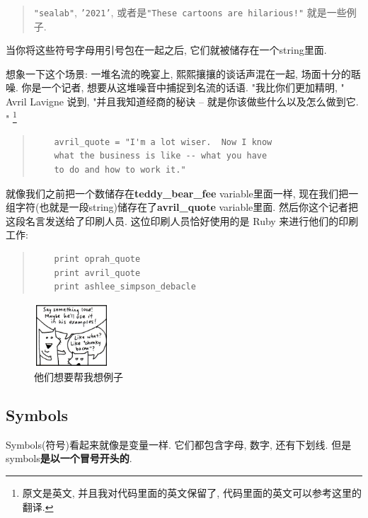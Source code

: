 \begin{quotation}
  \texttt{"sealab"}, \texttt{'2021'}, 或者是\texttt{"These cartoons are hilarious!"} 就是一些例子. 
\end{quotation}

当你将这些符号字母用引号包在一起之后, 它们就被储存在一个string里面. 

想象一下这个场景: 一堆名流的晚宴上, 熙熙攘攘的谈话声混在一起, 
场面十分的聒噪. 你是一个记者, 想要从这堆噪音中捕捉到名流的话语. 
"我比你们更加精明, " Avril Lavigne 说到, "并且我知道经商的秘诀
-- 就是你该做些什么以及怎么做到它. "
\footnote{原文是英文, 并且我对代码里面的英文保留了, 代码里面的英文可以参考这里的翻译. }

\begin{quotation}
  \begin{verbatim}
    avril_quote = "I'm a lot wiser.  Now I know
    what the business is like -- what you have
    to do and how to work it."
  \end{verbatim}
\end{quotation}

就像我们之前把一个数储存在\textbf{teddy\_bear\_fee} variable里面一样, 
现在我们把一组字符(也就是一段string)储存在了\textbf{avril\_quote} 
variable里面. 然后你这个记者把这段名言发送给了印刷人员. 
这位印刷人员恰好使用的是 Ruby 来进行他们的印刷工作: 

\begin{quotation}
  \begin{verbatim}
    print oprah_quote
    print avril_quote
    print ashlee_simpson_debacle  
  \end{verbatim}
\end{quotation}

\begin{figure}[h]
  \centering
  \includegraphics[width=0.25\textwidth]{image/why/foxes-4b.png}
  \caption{他们想要帮我想例子}
\end{figure}

\subsection*{Symbols}
Symbols(符号)看起来就像是变量一样. 它们都包含字母, 数字, 还有下划线. 
但是symbols\textbf{是以一个冒号开头的}. 

